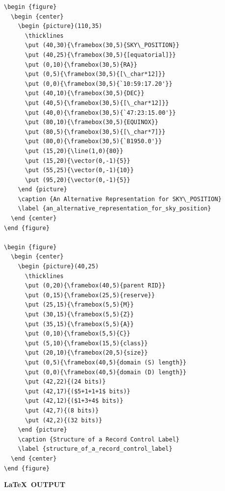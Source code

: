 \documentclass[11pt,twoside]{article}
\begin{document}
\newpage 

\small
\begin{verbatim}
\begin {figure}
  \begin {center}
    \begin {picture}(110,35)
      \thicklines
      \put (40,30){\framebox(30,5){SKY\_POSITION}}
      \put (40,25){\framebox(30,5){[equatorial]}}
      \put (0,10){\framebox(30,5){RA}}
      \put (0,5){\framebox(30,5){[\_char*12]}}
      \put (0,0){\framebox(30,5){`10:59:17.20'}}
      \put (40,10){\framebox(30,5){DEC}}
      \put (40,5){\framebox(30,5){[\_char*12]}}
      \put (40,0){\framebox(30,5){`47:23:15.00'}}
      \put (80,10){\framebox(30,5){EQUINOX}}
      \put (80,5){\framebox(30,5){[\_char*7]}}
      \put (80,0){\framebox(30,5){`B1950.0'}}
      \put (15,20){\line(1,0){80}}
      \put (15,20){\vector(0,-1){5}}
      \put (55,25){\vector(0,-1){10}}
      \put (95,20){\vector(0,-1){5}}
    \end {picture}
    \caption {An Alternative Representation for SKY\_POSITION}
    \label {an_alternative_representation_for_sky_position}
  \end {center}
\end {figure}

\begin {figure}
  \begin {center}
    \begin {picture}(40,25)
      \thicklines
      \put (0,20){\framebox(40,5){parent RID}}
      \put (0,15){\framebox(25,5){reserve}}
      \put (25,15){\framebox(5,5){M}}
      \put (30,15){\framebox(5,5){Z}}
      \put (35,15){\framebox(5,5){A}}
      \put (0,10){\framebox(5,5){C}}
      \put (5,10){\framebox(15,5){class}}
      \put (20,10){\framebox(20,5){size}}
      \put (0,5){\framebox(40,5){domain (S) length}}
      \put (0,0){\framebox(40,5){domain (D) length}}
      \put (42,22){(24 bits)}
      \put (42,17){($5+1+1+1$ bits)}
      \put (42,12){($1+3+4$ bits)}
      \put (42,7){(8 bits)}
      \put (42,2){(32 bits)}
    \end {picture}
    \caption {Structure of a Record Control Label}
    \label {structure_of_a_record_control_label}
  \end {center}
\end {figure}
\end{verbatim}
\normalsize

\newpage

\begin{center}
  \textbf{\LaTeX\ OUTPUT}
\end{center}
\end{document}
